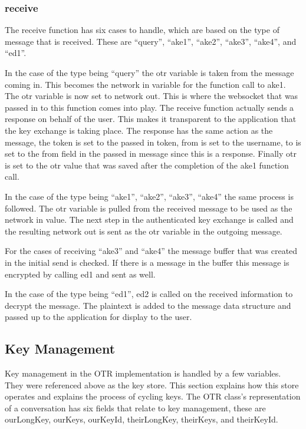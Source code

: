 \subsubsection{receive}


The receive function has six cases to handle, which are based on the type of message that is received. These are “query”, “ake1”, “ake2”, “ake3”, “ake4”, and “ed1”.


In the case of the type being “query” the otr variable is taken from the message coming in. This becomes the network in variable for the function call to ake1. The otr variable is now set to network out. This is where the websocket that was passed in to this function comes into play. The receive function actually sends a response on behalf of the user. This makes it transparent to the application that the key exchange is taking place. The response has the same action as the message, the token is set to the passed in token, from is set to the username, to is set to the from field in the passed in message since this is a response. Finally otr is set to the otr value that was saved after the completion of the ake1 function call.


In the case of the type being “ake1”, “ake2”, “ake3”, “ake4” the same process is followed. The otr variable is pulled from the received message to be used as the network in value. The next step in the authenticated key exchange is called and the resulting network out is sent as the otr variable in the outgoing message.


For the cases of receiving “ake3” and “ake4” the message buffer that was created in the initial send is checked. If there is a message in the buffer this message is encrypted by calling ed1 and sent as well. 


In the case of the type being “ed1”, ed2 is called on the received information to decrypt the message. The plaintext is added to the message data structure and passed up to the application for display to the user.


\subsection{Key Management}


Key management in the OTR implementation is handled by a few variables. They were referenced above as the key store. This section explains how this store operates and explains the process of cycling keys. The OTR class’s representation of a conversation has six fields that relate to key management, these are ourLongKey, ourKeys, ourKeyId, theirLongKey, theirKeys, and theirKeyId. 


